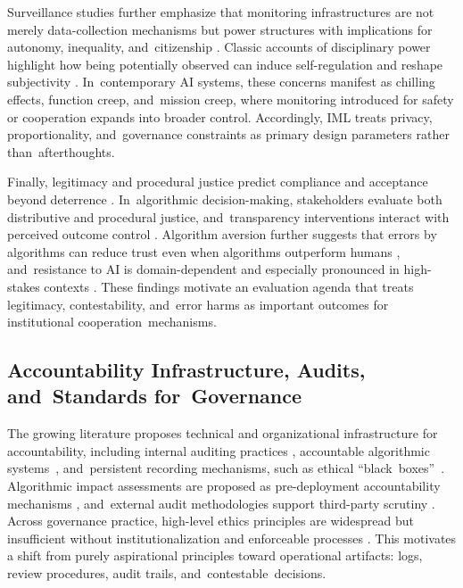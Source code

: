 \documentclass[mca,article,accept,pdftex,oneauthor]{Definitions/mdpi}
\begin{document}
Surveillance studies further emphasize that monitoring infrastructures are not merely data-collection mechanisms but power structures with implications for autonomy, inequality, and~citizenship \citep{Lyon2007Surveillance,Zuboff2019}. Classic accounts of disciplinary power highlight how being potentially observed can induce self-regulation and reshape subjectivity \citep{Foucault1977DisciplinePunish}. In~contemporary AI systems, these concerns manifest as chilling effects, function creep, and~mission creep, where monitoring introduced for safety or cooperation expands into broader control. Accordingly, IML treats privacy, proportionality, and~governance constraints as primary design parameters rather than~afterthoughts.

Finally, legitimacy and procedural justice predict compliance and acceptance beyond deterrence \citep{Tyler1990}. In~algorithmic decision-making, stakeholders evaluate both distributive and procedural justice, and~transparency interventions interact with perceived outcome control \citep{Binns2018CHI,Lee2019ProceduralJustice}. Algorithm aversion further suggests that errors by algorithms can reduce trust even when algorithms outperform humans \citep{Dietvorst2015}, and~resistance to AI is domain-dependent and especially pronounced in high-stakes contexts \citep{Longoni2019}. These findings motivate an evaluation agenda that treats legitimacy, contestability, and~error harms as important outcomes for institutional cooperation~mechanisms.

\subsection{Accountability Infrastructure, Audits, and~Standards for~Governance}

The growing literature proposes technical and organizational infrastructure for accountability, including internal auditing practices \citep{Raji2020Auditing}, accountable algorithmic \mbox{systems \citep{Kroll2017AccountableAlgorithms},} and~persistent recording mechanisms, such as ethical \mbox{``black boxes'' \citep{WinfieldJirotka2017}.} Algorithmic impact assessments are proposed as pre-deployment accountability mechanisms \citep{Metcalf2021AIA,Selbst2021AIA}, and~external audit methodologies support third-party scrutiny \citep{Sandvig2014AuditingAlgorithms}. Across governance practice, high-level ethics principles are widespread but insufficient without institutionalization and enforceable processes \citep{Jobin2019EthicsGuidelines,Mittelstadt2019Principles}. This motivates a shift from purely aspirational principles toward operational artifacts: logs, review procedures, audit trails, and~contestable~decisions.
\end{document}
